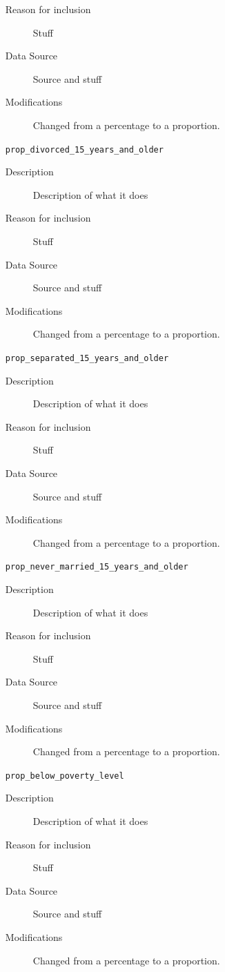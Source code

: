 \documentclass{article}
\begin{document}
\begin{itemize}[label={}, align=left]
\begin{description}
              \item[Reason for inclusion] Stuff
              \item[Data Source] Source and stuff
              \item[Modifications] Changed from a percentage to a proportion.
          \end{description}
    \item[\texttt{prop\_divorced\_15\_years\_and\_older}] \
          \begin{description}
              \item[Description] Description of what it does
              \item[Reason for inclusion] Stuff
              \item[Data Source] Source and stuff
              \item[Modifications] Changed from a percentage to a proportion.
          \end{description}
    \item[\texttt{prop\_separated\_15\_years\_and\_older}] \
          \begin{description}
              \item[Description] Description of what it does
              \item[Reason for inclusion] Stuff
              \item[Data Source] Source and stuff
              \item[Modifications] Changed from a percentage to a proportion.
          \end{description}
    \item[\texttt{prop\_never\_married\_15\_years\_and\_older}] \
          \begin{description}
              \item[Description] Description of what it does
              \item[Reason for inclusion] Stuff
              \item[Data Source] Source and stuff
              \item[Modifications] Changed from a percentage to a proportion.
          \end{description}
    \item[\texttt{prop\_below\_poverty\_level}] \
          \begin{description}
              \item[Description] Description of what it does
              \item[Reason for inclusion] Stuff
              \item[Data Source] Source and stuff
              \item[Modifications] Changed from a percentage to a proportion.
          \end{description}
\end{itemize}
\end{document}
